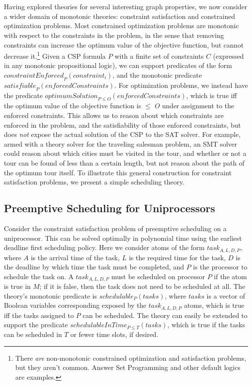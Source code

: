 \documentclass[runningheads]{llncs}
\begin{document}
~\\
~\\
Having explored theories for several interesting graph properties, we now
consider a wider domain of monotonic theories: constraint satisfaction
and constrained optimization problems. Most constrained optimization
problems are monotonic with respect to the constraints in the problem, in
the sense that removing constraints can increase the optimum value of the
objective function, but cannot decrease it.\footnote{There \textit{are}
non-monotonic constrained optimization and satisfaction problems, but
they aren't common. Answer Set Programming and other default logics are
examples.}  Given a CSP formula $P$ with a finite set of constraints
$C$ (expressed in any monotonic propositional logic), we can support
predicates of the form $\textit{constraintEnforced}_{P}(constraint_i)$, and the monotonic
predicate $\textit{satisfiable}_P(enforcedConstraints)$. For optimization problems, we instead have
the predicate $\textit{optimumSolution}_{P \leq O}(enforcedConstraints)$, which is true iff the optimum
value of the objective function is $\leq$ $O$ under assignment to the enforced constraints.
This allows us to reason about which constraints are enforced in the
problem, and the satisfiability of those enforced constraints, but does
\textit{not} expose the actual solution of the CSP to the SAT solver.
For example, armed with a theory solver for the traveling salesman problem,
an SMT solver could reason about which cities must be visited in the tour,
and whether or not a tour can be found of less than a certain length,
but not reason about the path of the optimum tour itself. To illustrate this general construction for constraint
satisfaction problems, we present a simple scheduling theory.









\subsection{{Preemptive Scheduling for Uniprocessors}}
Consider the constraint satisfaction problem of preemptive scheduling on a uniprocessor. This can be solved optimally in polynomial time using the earliest deadline first scheduling policy\cite{liu1973scheduling}. Here we consider atoms of the form $task_{A,L,D,P}$, where $A$ is the arrival time of the task, $L$ is the required time for the task, $D$ is the deadline by which time the task must be completed, and $P$ is the processor to schedule the task on. A $task_{A,L,D,P}$ must be scheduled on processor $P$ if the atom is true in $M$; if it is false, then the task does not need to be scheduled at all. The theory's monotonic predicate is $schedulable_P(tasks)$, where $tasks$ is a vector of Boolean variables corresponding exposed by the $task_{A,L,D,P}$ atoms, which is true iff the tasks assigned to $P$ can be scheduled. The theory can easily be extended to support the predicate $schedulableInTime_{P \leq T}(tasks)$, which is true if the tasks can be scheduled in $T$ or fewer time slots, if desired. 
\end{document}
